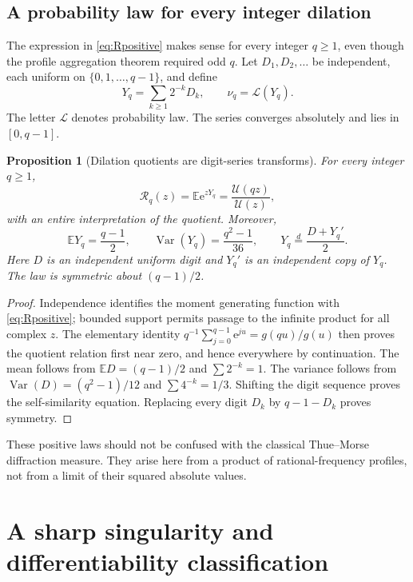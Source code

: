 \documentclass[11pt,letterpaper]{article}
\numberwithin{equation}{section}
\newtheorem{proposition}[theorem]{Proposition}
\theoremstyle{definition}
\theoremstyle{remark}
\newcommand{\E}{\mathbb E}
\newcommand{\Up}{\mathcal U}
\newcommand{\Rp}{\mathcal R}
\newcommand{\e}{\mathrm e}
\begin{document}
\subsection{A probability law for every integer dilation}
The expression in \eqref{eq:Rpositive} makes sense for every integer \(q\geq1\), even though the profile aggregation theorem required odd \(q\). Let \(D_1,D_2,\ldots\) be independent, each uniform on \(\{0,1,\ldots,q-1\}\), and define
\begin{equation}
 Y_q=\sum_{k\geq1}2^{-k}D_k,\qquad \nu_q=\mathcal L(Y_q).
 \label{eq:Yq}
\end{equation}
The letter \(\mathcal L\) denotes probability law. The series converges absolutely and lies in \([0,q-1]\).

\begin{proposition}[Dilation quotients are digit-series transforms]
For every integer \(q\geq1\),
\begin{equation}
 \Rp_q(z)=\E\e^{zY_q}=\frac{\Up(qz)}{\Up(z)},
 \label{eq:digittransform}
\end{equation}
with an entire interpretation of the quotient. Moreover,
\begin{equation}
 \E Y_q=\frac{q-1}{2},\qquad
 \operatorname{Var}(Y_q)=\frac{q^2-1}{36},\qquad
 Y_q\overset d=\frac{D+Y_q'}2.
 \label{eq:Ymoments}
\end{equation}
Here \(D\) is an independent uniform digit and \(Y_q'\) is an independent copy of \(Y_q\). The law is symmetric about \((q-1)/2\).
\end{proposition}
\begin{proof}
Independence identifies the moment generating function with \eqref{eq:Rpositive}; bounded support permits passage to the infinite product for all complex \(z\). The elementary identity
\(q^{-1}\sum_{j=0}^{q-1}\e^{ju}=g(qu)/g(u)\)
then proves the quotient relation first near zero, and hence everywhere by continuation. The mean follows from \(\E D=(q-1)/2\) and \(\sum2^{-k}=1\). The variance follows from \(\operatorname{Var}(D)=(q^2-1)/12\) and \(\sum4^{-k}=1/3\). Shifting the digit sequence proves the self-similarity equation. Replacing every digit \(D_k\) by \(q-1-D_k\) proves symmetry.
\end{proof}
These positive laws should not be confused with the classical Thue--Morse diffraction measure. They arise here from a product of rational-frequency profiles, not from a limit of their squared absolute values.

\section{A sharp singularity and differentiability classification}
\label{sec:regularity}
\end{document}
